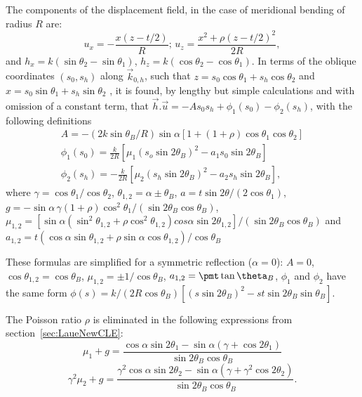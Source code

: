 \documentclass[preprint]{iucr}              %
\begin{document}
The components of the displacement field, in the case of meridional bending of radius $R$ are:
\begin{equation}
    u_x = -\frac{x(z-t/2)}{R}; \, u_z=\frac{x^2+\rho(z-t/2)^2}{2R},
\end{equation}
and $h_x=k(\sin\theta_2-\sin\theta_1)$, $h_z=k(\cos\theta_2-\cos\theta_1)$.
In terms of the oblique coordinates $(s_0,s_h)$ along $\vec k_{0,h}$, such that $z=s_0\cos\theta_1 + s_h \cos\theta_2$ and $x=s_0 \sin\theta_1+s_h\sin\theta_2$ , 
it is found, by lengthy but simple calculations and with omission of a constant term, that $\vec h.\vec u=-A s_0 s_h + \phi_1(s_0) -\phi_2(s_h)$,  
with the following definitions
\begin{multline}
    A = -(2 k \sin\theta_B /R)\sin\alpha[1+(1+\rho)\cos\theta_1\cos\theta_2] \\
    \phi_1(s_0) = \frac{k}{2R}[\mu_1(s_o\sin2\theta_B)^2-a_1 s_0\sin2\theta_B] \\
    \phi_2(s_h) = -\frac{k}{2R}[\mu_2(s_h\sin2\theta_B)^2-a_2 s_h\sin2\theta_B],
\end{multline}
where $\gamma=\cos\theta_1/\cos\theta_2$, $\theta_{1,2}=\alpha\pm \theta_B$, $a=t \sin2\theta / (2\cos\theta_1)$, 
$g=-\sin\alpha \, \gamma (1+\rho)\cos^2\theta_1/(\sin2\theta_B\cos\theta_B)$,
$\mu_{1,2}=[\sin\alpha(\sin^2\theta_{1,2}+\rho\cos^2\theta_{1,2})cos\alpha\sin2\theta_{1,2}]/(\sin2\theta_B\cos\theta_B)$ and
$a_{1,2}=t(\cos\alpha\sin\theta_{1,2}+\rho\sin\alpha\cos\theta_{1,2})/\cos\theta_B$ 


These formulas are simplified for a symmetric reflection ($\alpha=0$):
$A=0$, $\cos\theta_{1,2}=\cos\theta_B$, $\mu_{1,2}=\pm1/\cos\theta_B$, $a_{1,2}=\pmt\tan\theta_B$, $\phi_1$ and  $\phi_2$ have the same form $\phi(s)=k/(2R\cos\theta_B)[(s\sin2\theta_B)^2-s t \sin2\theta_B\sin\theta_B]$. 

The Poisson ratio $\rho$ is eliminated in the following expressions from section~\ref{sec:LaueNewCLE}: 
\begin{equation}
    \mu_1+g=\frac{\cos\alpha\sin2\theta_1-\sin\alpha(\gamma+\cos2\theta_1)}{\sin2\theta_B\cos\theta_B}
\end{equation}
\begin{equation}
    \gamma^2\mu_2+g=\frac{\gamma^2\cos\alpha\sin2\theta_2-\sin\alpha(\gamma+\gamma^2\cos2\theta_2)}{\sin2\theta_B\cos\theta_B}.
\end{equation}
\end{document}
